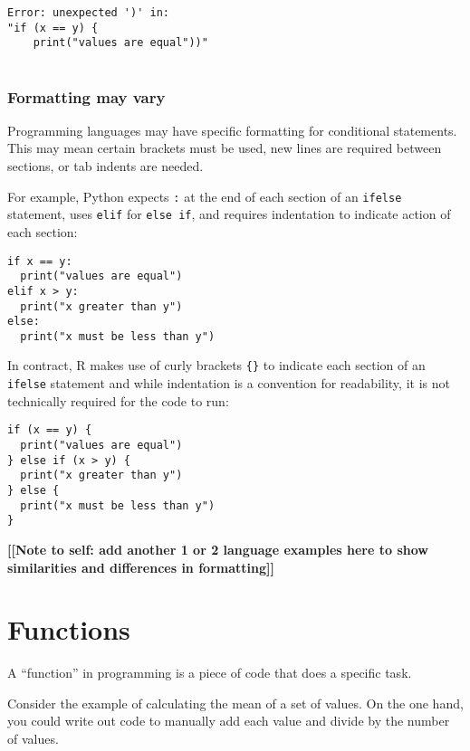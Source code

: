 \documentclass[
]{book}
\begin{document}
\begin{verbatim}
Error: unexpected ')' in:
"if (x == y) {
    print("values are equal"))"
    
\end{verbatim}

\subsection{Formatting may vary}\label{formatting-may-vary}

Programming languages may have specific formatting for conditional statements. This may mean certain brackets must be used, new lines are required between sections, or tab indents are needed.

For example, Python expects \texttt{:} at the end of each section of an \texttt{ifelse} statement, uses \texttt{elif} for \texttt{else\ if}, and requires indentation to indicate action of each section:

\begin{verbatim}
if x == y:
  print("values are equal")
elif x > y:
  print("x greater than y")
else:
  print("x must be less than y")
\end{verbatim}

In contract, R makes use of curly brackets \texttt{\{\}} to indicate each section of an \texttt{ifelse} statement and while indentation is a convention for readability, it is not technically required for the code to run:

\begin{verbatim}
if (x == y) {
  print("values are equal")
} else if (x > y) {
  print("x greater than y")
} else {
  print("x must be less than y")
}
\end{verbatim}

\textbf{{[}{[}Note to self: add another 1 or 2 language examples here to show similarities and differences in formatting{]}{]}}

\chapter{Functions}\label{functions}

A ``function'' in programming is a piece of code that does a specific task.

Consider the example of calculating the mean of a set of values. On the one hand, you could write out code to manually add each value and divide by the number of values.\\
\end{document}
